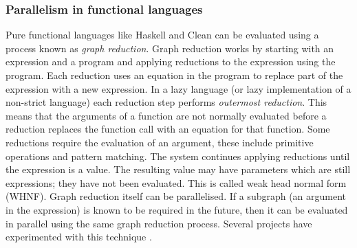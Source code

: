 
\subsubsection{Parallelism in functional languages}
\label{sec:intro_par_func}


Pure functional languages like Haskell and Clean can be evaluated using a
process known as \emph{graph reduction}.
Graph reduction works by starting with an expression and a program and
applying reductions to the expression using the program.
Each reduction uses an equation in the program to replace part of the
expression with a new expression.
In a lazy language (or lazy implementation of a non-strict language)
each reduction step performs \emph{outermost reduction}.
This means that the arguments of a function are not normally evaluated
before a reduction replaces the function call with an equation for that
function.
Some reductions require the evaluation of an argument,
these include primitive operations and pattern matching.
The system continues applying reductions until the expression is
a value.
The resulting value may have parameters which are still expressions;
they have not been evaluated.
This is called weak head normal form (WHNF).
Graph reduction itself can be parallelised.
If a subgraph (an argument in the expression) is known to be required in the
future,
then it can be evaluated in parallel using the same graph reduction process.
Several projects have experimented with this technique
\citep{augustsson:1989:parallel-graph-reduction,burn:1989:parallel-reduction-machine,peyton-jones:1989:parallel-graph-reduction}.

